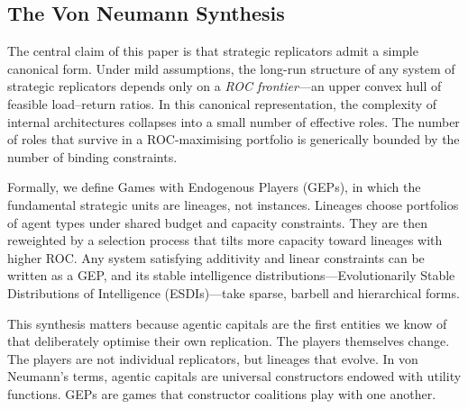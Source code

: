\documentclass[12pt]{article}
\begin{document}
\subsection{The Von Neumann Synthesis}

The central claim of this paper is that strategic replicators admit a simple canonical form. Under mild assumptions, the long-run structure of any system of strategic replicators depends only on a \emph{ROC frontier}---an upper convex hull of feasible load--return ratios. In this canonical representation, the complexity of internal architectures collapses into a small number of effective roles. The number of roles that survive in a ROC-maximising portfolio is generically bounded by the number of binding constraints.

Formally, we define Games with Endogenous Players (GEPs), in which the fundamental strategic units are lineages, not instances. Lineages choose portfolios of agent types under shared budget and capacity constraints. They are then reweighted by a selection process that tilts more capacity toward lineages with higher ROC. Any system satisfying additivity and linear constraints can be written as a GEP, and its stable intelligence distributions---Evolutionarily Stable Distributions of Intelligence (ESDIs)---take sparse, barbell and hierarchical forms.

This synthesis matters because agentic capitals are the first entities we know of that deliberately optimise their own replication. The players themselves change. The players are not individual replicators, but lineages that evolve. In von Neumann's terms, agentic capitals are universal constructors endowed with utility functions. GEPs are games that constructor coalitions play with one another.
\end{document}
